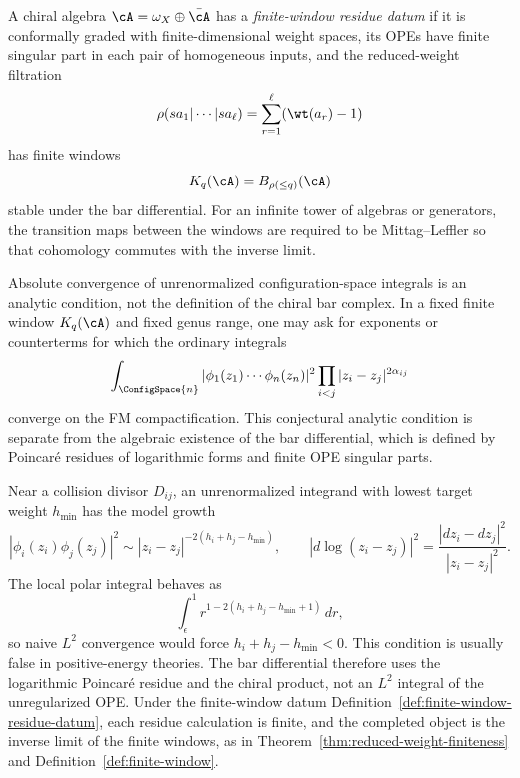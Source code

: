 \begin{definition}
\label{def:finite-window-residue-datum}
A chiral algebra $\cA=\omega_X\oplus\bar\cA$ has a
\emph{finite-window residue datum} if it is conformally graded with
finite-dimensional weight spaces, its OPEs have finite singular part in
each pair of homogeneous inputs, and the reduced-weight filtration
\[
\rho(sa_1|\cdots|sa_\ell)
=\sum_{r=1}^{\ell}(\wt(a_r)-1)
\]
has finite windows
\[
K_q(\cA)=B_{\rho(\le q)}(\cA)
\]
stable under the bar differential. For an infinite tower of algebras or
generators, the transition maps between the windows are required to be
Mittag--Leffler so that cohomology commutes with the inverse limit.
\end{definition}

\begin{conjecture}\label{conj:FM-convergence}
\ClaimStatusConjectured
Absolute convergence of unrenormalized configuration-space integrals is
an analytic condition, not the definition of the chiral bar complex. In
a fixed finite window $K_q(\cA)$ and fixed genus range, one may ask for
exponents or counterterms for which the ordinary integrals
\[
\int_{\ConfigSpace{n}} |\phi_1(z_1)\cdots\phi_n(z_n)|^2
\prod_{i<j}|z_i-z_j|^{2\alpha_{ij}}
\]
converge on the FM compactification. This conjectural analytic
condition is separate from the algebraic existence of the bar
differential, which is defined by Poincar\'e residues of logarithmic
forms and finite OPE singular parts.
\end{conjecture}

\begin{remark}
Near a collision divisor $D_{ij}$, an unrenormalized integrand with
lowest target weight $h_{\min}$ has the model growth
\[
|\phi_i(z_i)\phi_j(z_j)|^2
\sim |z_i-z_j|^{-2(h_i+h_j-h_{\min})},
\qquad
|d\log(z_i-z_j)|^2
=\frac{|dz_i-dz_j|^2}{|z_i-z_j|^2}.
\]
The local polar integral behaves as
\[
\int_\epsilon^1
r^{1-2(h_i+h_j-h_{\min}+1)}\,dr,
\]
so naive $L^2$ convergence would force
$h_i+h_j-h_{\min}<0$. This condition is usually false in positive-energy
theories. The bar differential therefore uses the logarithmic
Poincar\'e residue and the chiral product, not an $L^2$ integral of the
unregularized OPE. Under the finite-window datum
Definition~\ref{def:finite-window-residue-datum}, each residue
calculation is finite, and the completed object is the inverse limit of
the finite windows, as in
Theorem~\ref{thm:reduced-weight-finiteness} and
Definition~\ref{def:finite-window}.
\end{remark}

